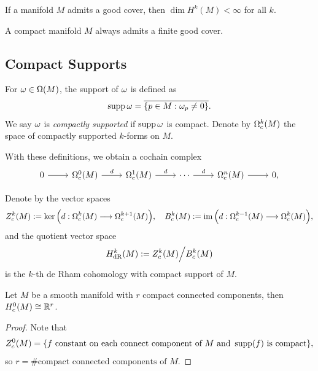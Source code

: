 \begin{proposition}
    If a manifold \(M\) admits a good cover, then \(\dim H^k(M)<\infty\) for all \(k\).
\end{proposition}

\begin{proposition}
    A compact manifold \(M\) always admits a finite good cover.
\end{proposition}

\subsection*{Compact Supports}

\begin{definition}
    For \(\omega\in\Omega(M)\), the support of \(\omega\) is defined as \[
        \operatorname{supp}\omega = \overline{\{p\in M:\omega_p\neq 0\}}.
    \] We say \(\omega\) is \emph{compactly supported} if \(\operatorname{supp}\omega\) is compact.
    Denote by \(\Omega_c^k(M)\) the space of compactly supported \(k\)-forms on \(M\).
\end{definition}

With these definitions, we obtain a cochain complex \[
    \begin{tikzcd}
        0 \ar{r} & \Omg_c^0(M) \ar{r}{d} & \Omg_c^1(M) \ar{r}{d} & \cdots \ar{r}{d} & \Omg_c^n(M) \ar{r} & 0,
    \end{tikzcd}
\]

\begin{definition}
    Denote by the vector spaces \[
        Z_c^k(M) := \ker\Big(d:\Omega_c^k(M)\longrightarrow\Omega_c^{k+1}(M)\Big),\quad
        B_c^k(M) := \operatorname{im}\Big(d:\Omega_c^{k-1}(M)\longrightarrow\Omega_c^k(M)\Big),
    \] and the quotient vector space \[
        H_{\mathrm{dR}}^k(M) := Z_c^k(M) \Big/ B_c^k(M)
    \] is the \(k\)-th de Rham cohomology with compact support of \(M\).
\end{definition}

\begin{proposition}\label{prop:Hc0_conn_comp}
    Let \(M\) be a smooth manifold with \(r\) compact connected components, then \(H_c^0(M)\cong \mathbb{R}^r\).
\end{proposition}
\begin{proof}
    Note that \[
        Z_c^0(M) = \{
            f\text{ constant on each connect component of }M\text{ and }\operatorname{supp}(f)\text{ is compact}
        \},
    \] so \(r = \#{\text{compact connected components of }M}\).
\end{proof}

